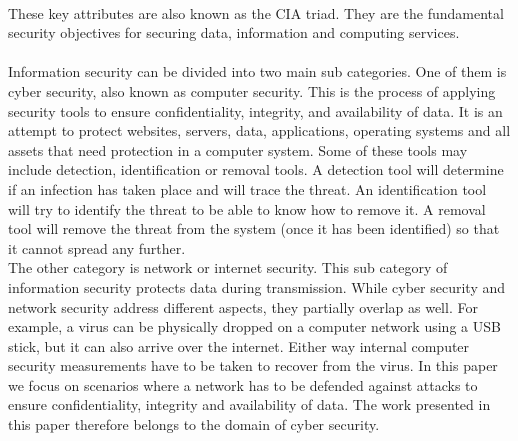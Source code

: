  ~~\\
 These key attributes are also known as the CIA triad. They are the fundamental security objectives for securing data, information and computing services. \\
 \\
Information security can be divided into two main sub categories. One of them is cyber security, also known as computer security. This is the process of applying security tools to ensure confidentiality, integrity, and availability of data. It is an attempt to protect websites, servers, data, applications, operating systems and all assets that need protection in a computer system.  Some of these tools may include detection, identification or removal tools. A detection tool will determine if an infection has taken place and will trace the threat. An identification tool will try to identify the threat to be able to know how to remove it. A removal tool will remove the threat from the system (once it has been identified) so that it cannot spread any further. \\
The other category is network or internet security. This sub category of information security protects data during transmission. While cyber security and network security address different aspects, they partially overlap as well. For example, a virus can be physically dropped on a computer network using a USB stick, but it can also arrive over the internet. Either way internal computer security measurements have to be taken to recover from the virus. In this paper we focus on scenarios where a network has to be defended against attacks to ensure confidentiality, integrity and availability of data. The work presented in this paper therefore belongs to the domain of cyber security.




